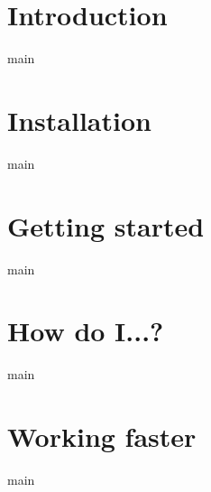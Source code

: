 \chapter{Introduction}
    {main}

\chapter{Installation}
    {main}

\chapter{Getting started}
    {main}
\chapter{How do I...?}
    {main}

\chapter{Working faster}
    {main}